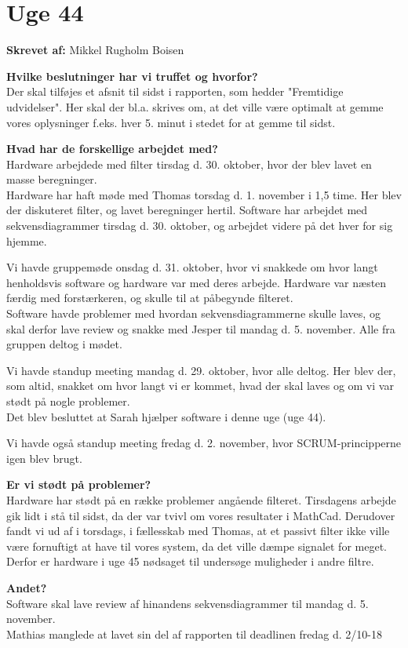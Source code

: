 \section{Uge 44}
\textbf{Skrevet af:} Mikkel Rugholm Boisen

\textbf{Hvilke beslutninger har vi truffet og hvorfor?} \\
Der skal tilføjes et afsnit til sidst i rapporten, som hedder "Fremtidige udvidelser". Her skal der bl.a. skrives om, at det ville være optimalt at gemme vores oplysninger f.eks. hver 5. minut i stedet for at gemme til sidst.

\textbf{Hvad har de forskellige arbejdet med?} \\
Hardware arbejdede med filter tirsdag d. 30. oktober, hvor der blev lavet en masse beregninger. \\
Hardware har haft møde med Thomas torsdag d. 1. november i 1,5 time. Her blev der diskuteret filter, og lavet beregninger hertil.
Software har arbejdet med sekvensdiagrammer tirsdag d. 30. oktober, og arbejdet videre på det hver for sig hjemme.

Vi havde gruppemøde onsdag d. 31. oktober, hvor vi snakkede om hvor langt henholdsvis software og hardware var med deres arbejde. Hardware var næsten færdig med forstærkeren, og skulle til at påbegynde filteret.  \\
Software havde problemer med hvordan sekvensdiagrammerne skulle laves, og skal derfor lave review og snakke med Jesper til mandag d. 5. november. Alle fra gruppen deltog i mødet.

Vi havde standup meeting mandag d. 29. oktober, hvor alle deltog. Her blev der, som altid, snakket om hvor langt vi er kommet, hvad der skal laves og om vi var stødt på nogle problemer. \\
Det blev besluttet at Sarah hjælper software i denne uge (uge 44).

Vi havde også standup meeting fredag d. 2. november, hvor SCRUM-principperne igen blev brugt.

\textbf{Er vi stødt på problemer?} \\
Hardware har stødt på en række problemer angående filteret. Tirsdagens arbejde gik lidt i stå til sidst, da der var tvivl om vores resultater i MathCad. Derudover fandt vi ud af i torsdags, i fællesskab med Thomas, at et passivt filter ikke ville være fornuftigt at have til vores system, da det ville dæmpe signalet for meget. Derfor er hardware i uge 45 nødsaget til undersøge muligheder i andre filtre.

\textbf{Andet?} \\
Software skal lave review af hinandens sekvensdiagrammer til mandag d. 5. november. \\
Mathias manglede at lavet sin del af rapporten til deadlinen fredag  d. 2/10-18

\clearpage
